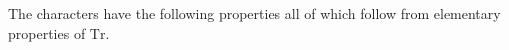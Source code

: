 The characters have the following properties all of which follow from elementary properties of $\text{Tr}$.
